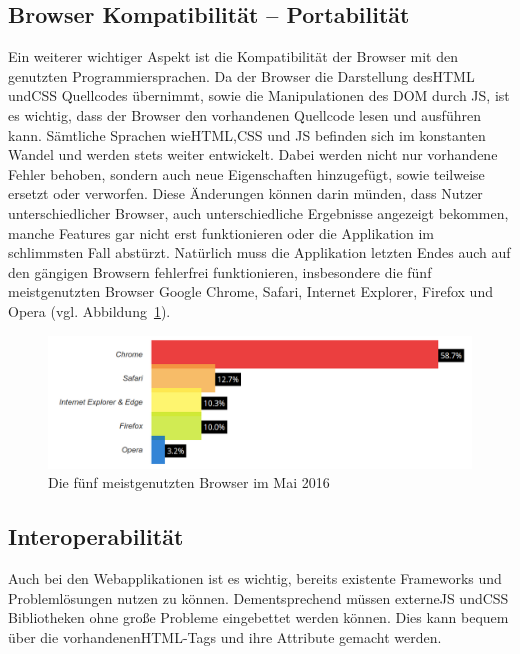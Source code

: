 \subsection{Browser Kompatibilität – Portabilität}
\label{sec:Browser Kompatibilität Portabilität}
Ein weiterer wichtiger Aspekt ist die Kompatibilität der Browser mit den genutzten Programmiersprachen. Da der Browser die Darstellung des\ac{HTML} und\ac{CSS} Quellcodes übernimmt, sowie die Manipulationen des DOM durch \ac{JS}, ist es wichtig, dass der Browser den vorhandenen Quellcode lesen und ausführen kann. Sämtliche Sprachen wie\ac{HTML},\ac{CSS} und \ac{JS} befinden sich im konstanten Wandel und werden stets weiter entwickelt.
Dabei werden nicht nur vorhandene Fehler behoben, sondern auch neue Eigenschaften hinzugefügt, sowie teilweise ersetzt oder verworfen. Diese Änderungen können darin münden, dass Nutzer unterschiedlicher Browser, auch unterschiedliche Ergebnisse angezeigt bekommen, manche Features gar nicht erst funktionieren oder die Applikation im schlimmsten Fall abstürzt. Natürlich muss die Applikation letzten Endes auch auf den gängigen Browsern fehlerfrei funktionieren, insbesondere die fünf meistgenutzten Browser Google Chrome, Safari, Internet Explorer, Firefox und Opera (vgl. Abbildung~\ref{fig:browser-may-2016}).

\begin{figure}[hb]
  \centering  
  \includegraphics[scale=0.3]{img/browser_2016.png}
  \caption{Die fünf meistgenutzten Browser im Mai 2016}\label{fig:browser-may-2016}
\end{figure}

\subsection{Interoperabilität}
\label{sec:Interoperabilität_Analyse}
Auch bei den Webapplikationen ist es wichtig, bereits existente Frameworks und Problemlösungen nutzen zu können. Dementsprechend müssen externe\ac{JS} und\ac{CSS} Bibliotheken ohne große Probleme eingebettet werden können. Dies kann bequem über die vorhandenen\ac{HTML}-Tags und ihre Attribute gemacht werden.


